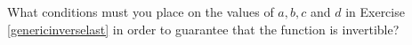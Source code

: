 {\label{whatconditions} What conditions must you place on the values of $a, b, c$ and $d$ in Exercise \ref{genericinverselast} in order to guarantee that the function is invertible?}
{}